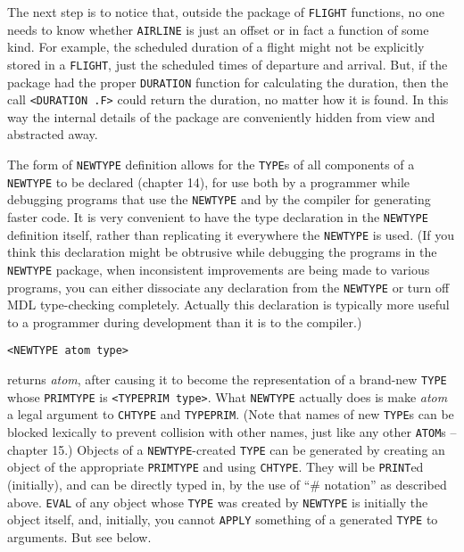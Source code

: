 \documentclass[a4paper,]{article}
\begin{document}
The next step is to notice that, outside the package of \texttt{FLIGHT} functions, no one needs to know whether
\texttt{AIRLINE} is just an offset or in fact a function of some kind. For example, the scheduled duration of a flight
might not be explicitly stored in a \texttt{FLIGHT}, just the scheduled times of departure and arrival. But, if the package
had the proper \texttt{DURATION} function for calculating the duration, then the call
\texttt{\textless{}DURATION\ .F\textgreater{}} could return the duration, no matter how it is found. In this way the
internal details of the package are conveniently hidden from view and abstracted away.

The form of \texttt{NEWTYPE} definition allows for the \texttt{TYPE}s of all components of a \texttt{NEWTYPE} to be
declared (chapter 14), for use both by a programmer while debugging programs that use the \texttt{NEWTYPE} and by the
compiler for generating faster code. It is very convenient to have the type declaration in the \texttt{NEWTYPE} definition
itself, rather than replicating it everywhere the \texttt{NEWTYPE} is used. (If you think this declaration might be
obtrusive while debugging the programs in the \texttt{NEWTYPE} package, when inconsistent improvements are being made to
various programs, you can either dissociate any declaration from the \texttt{NEWTYPE} or turn off MDL type-checking
completely. Actually this declaration is typically more useful to a programmer during development than it is to the
compiler.)

\begin{verbatim}
<NEWTYPE atom type>
\end{verbatim}

returns \emph{atom}, after causing it to become the representation of a brand-new \texttt{TYPE} whose \texttt{PRIMTYPE} is
\texttt{\textless{}TYPEPRIM\ type\textgreater{}}. What \texttt{NEWTYPE} actually does is make \emph{atom} a legal argument
to \texttt{CHTYPE} and \texttt{TYPEPRIM}. (Note that names of new \texttt{TYPE}s can be blocked lexically to prevent
collision with other names, just like any other \texttt{ATOM}s -- chapter 15.) Objects of a \texttt{NEWTYPE}-created
\texttt{TYPE} can be generated by creating an object of the appropriate \texttt{PRIMTYPE} and using \texttt{CHTYPE}. They
will be \texttt{PRINT}ed (initially), and can be directly typed in, by the use of ``\# notation'' as described above.
\texttt{EVAL} of any object whose \texttt{TYPE} was created by \texttt{NEWTYPE} is initially the object itself, and,
initially, you cannot \texttt{APPLY} something of a generated \texttt{TYPE} to arguments. But see below.
\end{document}
